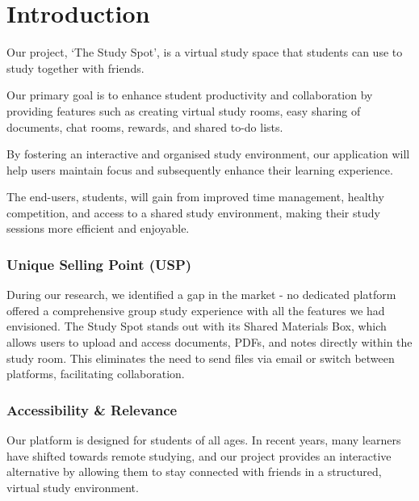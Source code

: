 \chapter{Introduction}
\label{chap:introduction}

Our project, ‘The Study Spot’, is a virtual study space that students can use to study together with friends.

Our primary goal is to enhance student productivity and collaboration by providing features such as creating virtual study rooms, easy sharing of documents, chat rooms, rewards, and shared to-do lists. 

By fostering an interactive and organised study environment, our application will help users maintain focus and subsequently enhance their learning experience.

The end-users, students, will gain from improved time management, healthy competition, and access to a shared study environment, making their study sessions more efficient and enjoyable.

\subsection*{Unique Selling Point (USP)}
During our research, we identified a gap in the market - no dedicated platform offered a comprehensive group study experience with all the features we had envisioned. The Study Spot stands out with its Shared Materials Box, which allows users to upload and access documents, PDFs, and notes directly within the study room. This eliminates the need to send files via email or switch between platforms, facilitating collaboration.

\subsection*{Accessibility \& Relevance}
Our platform is designed for students of all ages. In recent years, many learners have shifted towards remote studying, and our project provides an interactive alternative by allowing them to stay connected with friends in a structured, virtual study environment.

